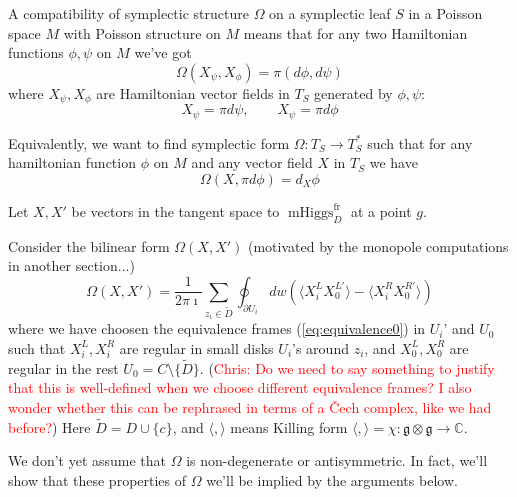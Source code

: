 \documentclass[11pt, oneside, reqno]{amsart}
\theoremstyle{definition} \newtheorem{definition}{Definition}[section]
\theoremstyle{definition} \newtheorem{remark}[definition]{Remark}
\theoremstyle{definition} \newtheorem{remarks}[definition]{Remarks}
\theoremstyle{definition} \newtheorem{question}[definition]{Question}
\theoremstyle{definition} \newtheorem*{note}{Note}
\theoremstyle{definition} \newtheorem{example}[definition]{Example}
\theoremstyle{definition} \newtheorem{examples}[definition]{Examples}
\renewcommand{\gg}{\mathfrak{g}}
\DeclareMathOperator{\mhiggs}{mHiggs}
\newcommand{\fr}{\mathrm{fr}}
\newcommand{\chris}[1]{(\textcolor{red}{Chris: #1})}
\begin{document}
 A compatibility of symplectic structure $\Omega$ on a symplectic leaf $S$ in a Poisson space $M$
 with Poisson structure on $M$  means that for any two Hamiltonian functions $\phi, \psi$ on $M$
 we've got
 \begin{equation}
\label{eq:compatibility}
   \Omega(X_{\psi}, X_{\phi}) = \pi (d\phi, d \psi)
 \end{equation}
 where $X_{\psi}, X_{\phi}$ are Hamiltonian vector fields in $T_{S}$ generated by $\phi, \psi$:
 \begin{equation}
   X_{\psi} = \pi d \psi, \qquad X_{\psi} = \pi d \phi 
 \end{equation}

 Equivalently, we want to find symplectic form $\Omega: T_{S} \to T_{S}^{*} $ such
 that for any hamiltonian function $\phi$ on $M$ and any vector field $X$ in $T_{S}$ we
 have
 \begin{equation}
   \Omega(X, \pi d \phi) = d_{X} \phi 
 \end{equation}

 Let $X, X'$ be vectors in the tangent space to $\mhiggs^{\fr}_D$ at a point $g$.

 Consider the bilinear form $\Omega(X, X')$ (motivated by the monopole
 computations in another section...) 
 \begin{equation}
\label{eq:Omega}
   \Omega(X, X')  = \frac{1}{2 \pi \imath} \sum_{z_i \in \tilde D} \oint_{\partial U_i}  dw (
\langle  X^{L}_{i} X^{L'}_{0} \rangle  - \langle X^{R}_{i}  X^{R'}_{0} \rangle )
\end{equation}
where we have choosen the equivalence frames (\ref{eq:equivalence0}) in $U_i$' and $U_0$ such that $X_i^{L}, X_i^{R}$ are regular in small disks $U_i$'s around $z_i$, and $X_0^{L}, X_{0}^{R}$ are regular in
the rest $U_0  = C \setminus \{\tilde D\}$. \chris{Do we need to say something to justify that this is well-defined when we choose different equivalence frames?  I also wonder whether this can be rephrased in terms of a \v Cech complex, like we had before?}
Here $\tilde D = D \cup \{ c \}$, and $\langle, \rangle$ means Killing form $\langle, \rangle = \chi: \gg \otimes \gg \to \mathbb{C}$.

We don't yet assume that $\Omega$ is non-degenerate or antisymmetric. In fact, we'll show
that these properties of $\Omega$  we'll be implied by the arguments below. 
\end{document}
